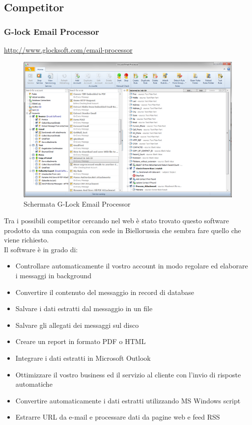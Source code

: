 \subsection{Competitor}
\subsubsection{G-lock Email Processor} 
\url{http://www.glocksoft.com/email-processor} \\



\begin{figure}[H]
\centering 
\includegraphics[scale=0.5]{img/gep-main-window-1.png}
\caption{Schermata G-Lock Email Processor}
\end{figure}


Tra i possibili competitor cercando nel web è stato trovato questo software prodotto da una compagnia con sede in Biellorussia che sembra fare quello che viene richiesto.\\
\linebreak Il software è in grado di:
\begin{itemize}
\item Controllare automaticamente il vostro account in modo regolare ed elaborare i messaggi in background 
\item Convertire il contenuto del messaggio in record di database 
\item Salvare i dati estratti dal messaggio in un file 
\item Salvare gli allegati dei messaggi sul disco
\item Creare un report in formato PDF o HTML 
\item Integrare i dati estratti in Microsoft Outlook 
\item Ottimizzare il vostro business ed il servizio al cliente con l'invio di risposte automatiche
\item Convertire automaticamente i dati estratti utilizzando MS Windows script  
\item Estrarre URL da e-mail e processare dati da pagine web e feed RSS 
\end{itemize}

